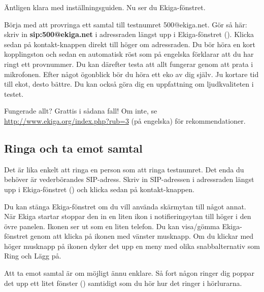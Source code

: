 \documentclass[a4paper,final]{memoir} %
\begin{document}
Äntligen klara med inställningsguiden. Nu ser du Ekiga-fönstret. 

Börja med att provringa ett samtal till testnumret 500@ekiga.net. Gör så här: skriv in \textbf{sip:500@ekiga.net} i adressraden längst upp i Ekiga-fönstret (). Klicka sedan på kontakt-knappen direkt till höger om adressraden. Du bör höra en kort kopplingston och sedan en automatisk röst som på engelska förklarar att du har ringt ett provnummer. Du kan därefter testa att allt fungerar genom att prata i mikrofonen. Efter något ögonblick bör du höra ett eko av dig själv. Ju kortare tid till ekot, desto bättre. Du kan också göra dig en uppfattning om ljudkvaliteten i testet.


Fungerade allt? Grattis i sådana fall! Om inte, se \url{http://www.ekiga.org/index.php?rub=3} (på engelska) för rekommendationer.


\subsection{Ringa och ta emot samtal}


Det är lika enkelt att ringa en person som att ringa testnumret. Det enda du behöver är vederbörandes SIP-adress. Skriv in SIP-adressen i adressraden längst upp i Ekiga-fönstret () och klicka sedan på kontakt-knappen.

Du kan stänga Ekiga-fönstret om du vill använda skärmytan till något annat. När Ekiga startar stoppar den in en liten ikon i notifieringsytan till höger i den övre panelen. Ikonen ser ut som en liten telefon. Du kan visa/gömma Ekiga-fönstret genom att klicka på ikonen med vänster musknapp. Om du klickar med höger musknapp på ikonen dyker det upp en meny med olika snabbalternativ som Ring och Lägg på.


Att ta emot samtal är om möjligt ännu enklare. Så fort någon ringer dig poppar det upp ett litet fönster () samtidigt som du hör hur det ringer i hörlurarna.

\end{document}
